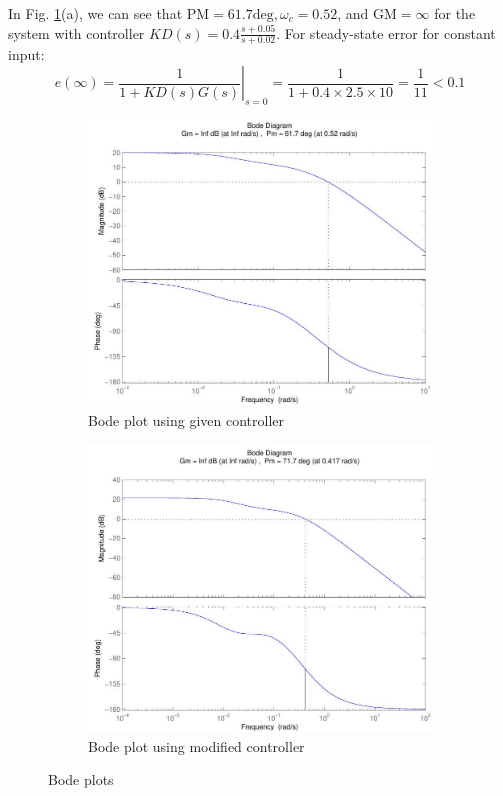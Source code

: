 \documentclass[12pt]{article}
\begin{document}
In Fig. \ref{fig:prb23}(a), we can see that \(\mathrm{PM}=61.7 \mathrm{deg}, \omega_{c}=0.52\), and \(\mathrm{GM}=\infty\) for the system with controller $ K D(s)=0.4 \frac{s+0.05}{s+0.02}$. For steady-state error for constant input:
\[
e(\infty)=\left.\frac{1}{1+K D(s) G(s)}\right|_{s=0}=\frac{1}{1+0.4 \times 2.5 \times 10}=\frac{1}{11}<0.1
\]
\begin{figure}[h!]
    \centering
    \begin{subfigure}[b]{0.45\textwidth}
    \centering
    \includegraphics[width=\textwidth]{figs/6.12-1.jpg}
     \caption{Bode plot using given controller}
     \end{subfigure}
     \begin{subfigure}[b]{0.45\textwidth}
     \centering
        \includegraphics[width=\textwidth]{figs/6.12-2.jpg}
        \caption{Bode plot using modified controller}
     \end{subfigure}
     \caption{Bode plots} \label{fig:prb23}
\end{figure}
\clearpage
\end{document}
